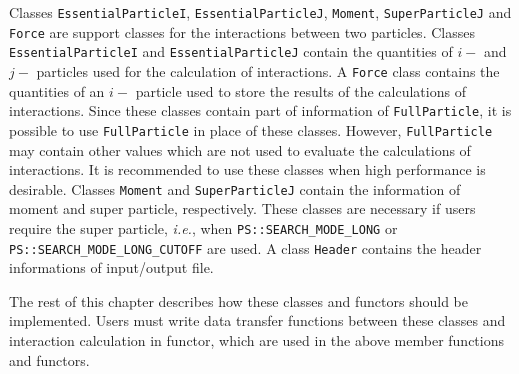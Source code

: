 Classes \texttt{EssentialParticleI}, \texttt{EssentialParticleJ}, \texttt{Moment},
\texttt{SuperParticleJ} and \texttt{Force} are support classes for the
interactions between two particles. Classes \texttt{EssentialParticleI} and
\texttt{EssentialParticleJ} contain the quantities of $i-$ and $j-$ particles used
for the calculation of interactions. A \texttt{Force} class contains the quantities
of an $i-$ particle used to store the results of the calculations of interactions.
Since these classes contain part of information of \texttt{FullParticle}, it is
possible to use \texttt{FullParticle} in place of these classes. However,
\texttt{FullParticle} may contain other values which are not used to evaluate
the calculations of interactions. It is recommended to use these classes when
high performance is desirable. Classes \texttt{Moment} and \texttt{SuperParticleJ}
contain the information of moment and super particle, respectively. These
classes are necessary if users require the super particle, \textit{i.e.}, when
\texttt{PS::SEARCH\_MODE\_LONG} or \texttt{PS::SEARCH\_MODE\_LONG\_CUTOFF}
are used. A class \texttt{Header} contains the header informations of
input/output file.

The rest of this chapter describes how these classes and functors should
be implemented. Users must write data transfer functions between these
classes and interaction calculation in functor, which are used in the above member
functions and functors.

